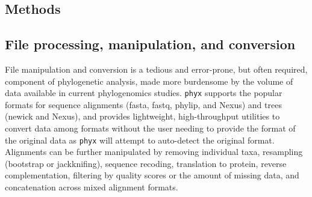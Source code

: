 \documentclass{bioinfo}
\begin{document}
\begin{methods}
\section{Methods}


\subsection{File processing, manipulation, and conversion}

File manipulation and conversion is a tedious and error-prone, but often required,
component of phylogenetic analysis, made more burdensome by the volume of data
available in current phylogenomics studies. \texttt{phyx} supports the
popular formats for sequence alignments (fasta, fastq, phylip, and Nexus)
and trees (newick and Nexus), and provides lightweight, high-throughput
utilities to convert data among formats without the user needing to
provide the format of the original data as \texttt{phyx} will attempt to auto-detect the original format. Alignments can be further
manipulated by removing individual taxa, resampling (bootstrap or
jackknifing), sequence recoding, translation to protein, reverse
complementation, filtering by quality scores or the amount of missing
data, and concatenation across mixed alignment formats.


\end{methods}
\end{document}
